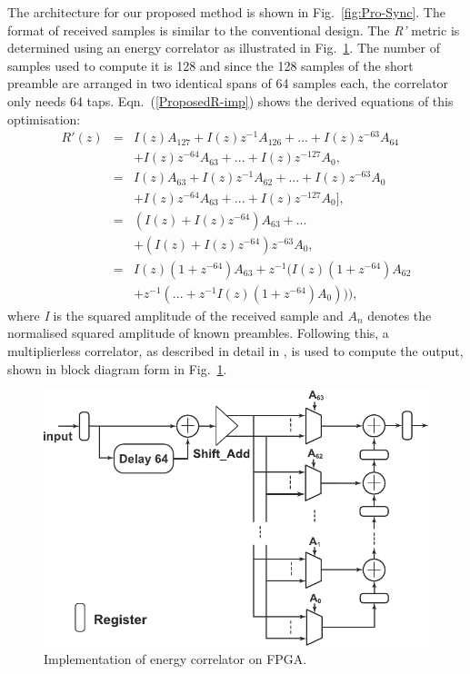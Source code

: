 The architecture for our proposed method is shown in Fig.~\ref{fig:Pro-Sync}.
The format of received samples is similar to the conventional design.
The \emph{R'} metric is determined using an energy correlator as illustrated in Fig.~\ref{fig:ML-Cor}.
The number of samples used to compute it is 128 and since the 128 samples of the short preamble are arranged in two identical spans of 64 samples each, the correlator only needs 64 taps.
Eqn.~(\ref{ProposedR-imp}) shows the derived equations of this optimisation:
\begin{eqnarray}
\label{ProposedR-imp}
R'(z) &=& I(z)A_{127} + I(z) z^{-1}A_{126} + ... + I(z) z^{-63}A_{64} \nonumber \\
	  &  &	+ I(z) z^{-64}A_{63} + ...+ I(z) z^{-127}A_0, \nonumber \\
	  &=& I(z)A_{63}   + I(z) z^{-1}A_{62}  +...+ I(z) z^{-63}A_0 \nonumber \\
	  &  &	+ I(z) z^{-64}A_{63} + ...+I(z) z^{-127} A_0], \nonumber \\
	  &=& (I(z)+I(z)z^{-64})A_{63} +... \nonumber \\
	  &  & 	+ (I(z)+I(z)z^{-64}) z^{-63}A_0, \nonumber \\
	  &=&I(z) (1+z^{-64})A_{63} +  z^{-1}(I(z)(1+z^{-64})A_{62}\nonumber \\
	  &	&						 + z^{-1 }( ...+z^{-1}I(z)(1+z^{-64})A_{0}))),
\end{eqnarray}
where \emph{I} is the squared amplitude of the received sample and $A_n$ denotes the normalised squared amplitude of known preambles.
Following this, a multiplierless correlator, as described in detail in \cite{Pham2012}, is used to compute the output, shown in block diagram form in Fig.~\ref{fig:ML-Cor}.

\begin{figure}[h]
	\centerline{\includegraphics [width=1\columnwidth] {figures/ML_Cor.pdf}}
	\caption{Implementation of energy correlator on FPGA.}
	\label{fig:ML-Cor}
\end{figure}

